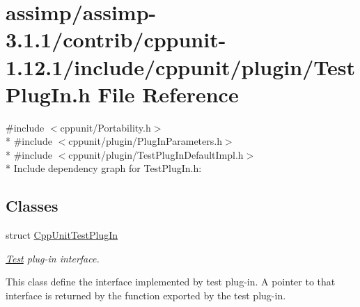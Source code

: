 \hypertarget{assimp_2assimp-3_81_81_2contrib_2cppunit-1_812_81_2include_2cppunit_2plugin_2_test_plug_in_8h}{\section{assimp/assimp-\/3.1.1/contrib/cppunit-\/1.12.1/include/cppunit/plugin/\+Test\+Plug\+In.h File Reference}
\label{assimp_2assimp-3_81_81_2contrib_2cppunit-1_812_81_2include_2cppunit_2plugin_2_test_plug_in_8h}
}
{\ttfamily \#include $<$cppunit/\+Portability.\+h$>$}\\*
{\ttfamily \#include $<$cppunit/plugin/\+Plug\+In\+Parameters.\+h$>$}\\*
{\ttfamily \#include $<$cppunit/plugin/\+Test\+Plug\+In\+Default\+Impl.\+h$>$}\\*
Include dependency graph for Test\+Plug\+In.\+h\+:
\subsection*{Classes}
\begin{DoxyCompactItemize}
\item 
struct \hyperlink{struct_cpp_unit_test_plug_in}{Cpp\+Unit\+Test\+Plug\+In}
\begin{DoxyCompactList}\small\item\em \hyperlink{class_test}{Test} plug-\/in interface.

This class define the interface implemented by test plug-\/in. A pointer to that interface is returned by the function exported by the test plug-\/in. \end{DoxyCompactList}\end{DoxyCompactItemize}
